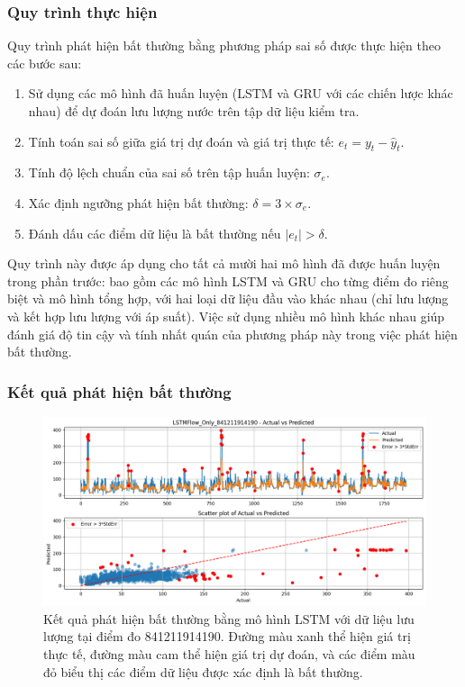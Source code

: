\subsubsection{Quy trình thực hiện}
Quy trình phát hiện bất thường bằng phương pháp sai số được thực hiện theo các bước sau:

\begin{enumerate}
    \item Sử dụng các mô hình đã huấn luyện (LSTM và GRU với các chiến lược khác nhau) để dự đoán lưu lượng nước trên tập dữ liệu kiểm tra.
    \item Tính toán sai số giữa giá trị dự đoán và giá trị thực tế: \(e_t = y_t - \hat{y}_t\).
    \item Tính độ lệch chuẩn của sai số trên tập huấn luyện: \(\sigma_e\).
    \item Xác định ngưỡng phát hiện bất thường: \(\delta = 3 \times \sigma_e\).
    \item Đánh dấu các điểm dữ liệu là bất thường nếu \(|e_t| > \delta\).
\end{enumerate}

Quy trình này được áp dụng cho tất cả mười hai mô hình đã được huấn luyện trong phần trước: bao gồm các mô hình LSTM và GRU cho từng điểm đo riêng biệt và mô hình tổng hợp, với hai loại dữ liệu đầu vào khác nhau (chỉ lưu lượng và kết hợp lưu lượng với áp suất). Việc sử dụng nhiều mô hình khác nhau giúp đánh giá độ tin cậy và tính nhất quán của phương pháp này trong việc phát hiện bất thường.

\subsubsection{Kết quả phát hiện bất thường}

\begin{figure}[htbp]
    \centering
    \includegraphics[width=\textwidth]{image/section6_3/anomaly_detection_841211914190_lstm_flow.png}
    \caption{Kết quả phát hiện bất thường bằng mô hình LSTM với dữ liệu lưu lượng tại điểm đo 841211914190. Đường màu xanh thể hiện giá trị thực tế, đường màu cam thể hiện giá trị dự đoán, và các điểm màu đỏ biểu thị các điểm dữ liệu được xác định là bất thường.}
    \label{fig:anomaly_lstm_841211914190_flow}
\end{figure}

